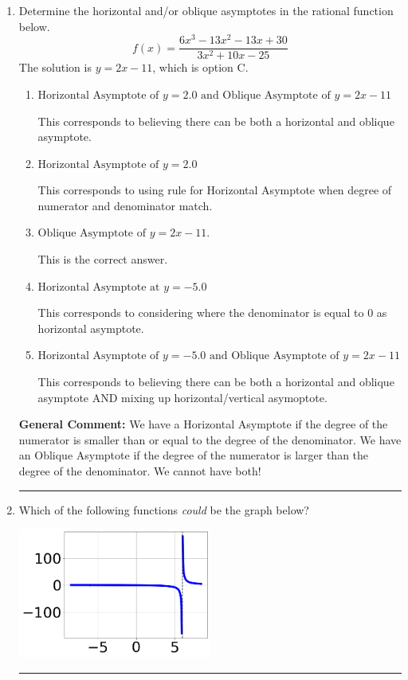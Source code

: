\documentclass{extbook}[14pt]
\newcommand{\litem}[1]{\item #1

\rule{\textwidth}{0.4pt}}
\begin{document}
\begin{enumerate}\litem{
Determine the horizontal and/or oblique asymptotes in the rational function below.
\[ f(x) = \frac{6x^{3} -13 x^{2} -13 x + 30}{3x^{2} +10 x -25} \]The solution is \( y = 2x -11 \), which is option C.\begin{enumerate}[label=\Alph*.]
\item \( \text{Horizontal Asymptote of } y = 2.0 \text{ and Oblique Asymptote of } y = 2x -11 \)

This corresponds to believing there can be both a horizontal and oblique asymptote.
\item \( \text{Horizontal Asymptote of } y = 2.0  \)

This corresponds to using rule for Horizontal Asymptote when degree of numerator and denominator match.
\item \( \text{Oblique Asymptote of } y = 2x -11. \)

This is the correct answer.
\item \( \text{Horizontal Asymptote at } y = -5.0 \)

This corresponds to considering where the denominator is equal to 0 as horizontal asymptote.
\item \( \text{Horizontal Asymptote of } y = -5.0 \text{ and Oblique Asymptote of } y = 2x -11 \)

This corresponds to believing there can be both a horizontal and oblique asymptote AND mixing up horizontal/vertical asymoptote.
\end{enumerate}

\textbf{General Comment:} We have a Horizontal Asymptote if the degree of the numerator is smaller than or equal to the degree of the denominator. We have an Oblique Asymptote if the degree of the numerator is larger than the degree of the denominator. We cannot have both!
}
\litem{
Which of the following functions \textit{could} be the graph below?

\begin{center}
    \includegraphics[width=0.5\textwidth]{../Figures/identifyGraphOfRationalFunctionC.png}
\end{center}


}
\end{enumerate}
\end{document}
